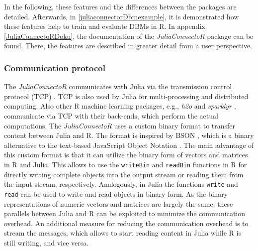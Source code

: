 \documentclass[12pt]{article}
\newcommand{\inlinecode}[1]{\texttt{#1}}
\newcommand{\apkg}[1]{\emph{#1}}
\begin{document}
In the following, these features and the differences between the packages are detailed.
Afterwards, in \ref{juliaconnectorDbmexample}, it is demonstrated how these features help to train and evaluate DBMs in R.
In appendix \ref{JuliaConnectoRDoku}, the documentation of the \apkg{JuliaConnectoR} package can be found.
There, the features are described in greater detail from a user perspective.

\subsubsection{Communication protocol}\label{juliaconnectorCommuncation}

The \apkg{JuliaConnectoR} communicates with Julia via the transmission control protocol (TCP) \citep{tcpspec}.
TCP is also used by Julia for multi-processing and distributed computing.
Also other R machine learning packages, e.g., \apkg{h2o} \citep{h2o} and \apkg{sparklyr} \citep{sparklyr}, communicate via TCP with their back-ends, which perform the actual computations.
The \apkg{JuliaConnectoR} uses a custom binary format to transfer content between Julia and R.
The format is inspired by BSON \citep{bsonspec}, which is a binary alternative to the text-based JavaScript Object Notation \citep{jsonspec1}.
The main advantage of this custom format is that it can utilize the binary form of vectors and matrices in R and Julia.
This allows to use the \inlinecode{writeBin} and \inlinecode{readBin} functions in R for directly writing complete objects into the output stream or reading them from the input stream, respectively.
Analogously, in Julia the functions \inlinecode{write} and \inlinecode{read} can be used to write and read objects in binary form.
As the binary representations of numeric vectors and matrices are largely the same, these parallels between Julia and R can be exploited to minimize the communication overhead.
An additional measure for reducing the communication overhead is to stream the messages, which allows to start reading content in Julia while R is still writing, and vice versa.
\end{document}
